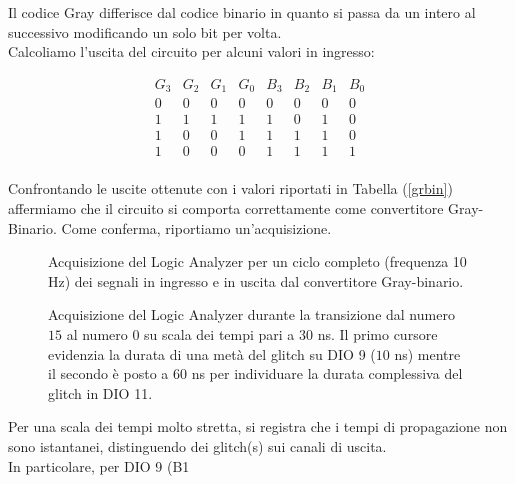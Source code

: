 \documentclass[10pt, a4paper, italian]{article}
\begin{document}
\newline
\newline
Il codice Gray differisce dal codice binario in quanto si passa da un intero al successivo modificando un solo bit per volta.\\
Calcoliamo l'uscita del circuito per alcuni valori in ingresso:
\begin{table}[htb!]
    \centering
    \[
    \begin{array}{cccc|cccc}
        G_3 & G_2 & G_1 & G_0 & B_3 & B_2 & B_1 & B_0\\
        \hline
        0 & 0 & 0 & 0 & 0 & 0 & 0 & 0\\
        1 & 1 & 1 & 1 & 1 & 0 & 1 & 0\\
        1 & 0 & 0 & 1 & 1 & 1 & 1 & 0\\
        1 & 0 & 0 & 0 & 1 & 1 & 1 & 1\\
    \end{array}
    \]
\end{table}
\FloatBarrier
Confrontando le uscite ottenute con i valori riportati in Tabella (\ref{grbin}) affermiamo che il circuito si comporta correttamente come convertitore Gray-Binario. Come conferma, riportiamo un'acquisizione.\\
\begin{figure}[htb!]
    \centering
    \caption{Acquisizione del Logic Analyzer per un ciclo completo (frequenza 10 Hz) dei segnali in ingresso e in uscita dal convertitore Gray-binario.}
\end{figure}
\begin{figure}[htb!]
    \centering
    \caption{Acquisizione del Logic Analyzer durante la transizione dal numero $15$ al numero $0$ su scala dei tempi pari a $30$ ns. Il primo cursore evidenzia la durata di una metà del glitch su DIO 9 ($10$ ns) mentre il secondo è posto a $60$ ns per individuare la durata complessiva del glitch in DIO 11.}
\end{figure}
Per una scala dei tempi molto stretta, si registra che i tempi di propagazione non sono istantanei, distinguendo dei glitch(s) sui canali di uscita. \\
In particolare, per DIO 9 (B1 
\end{document}
